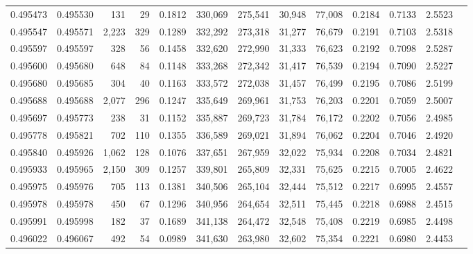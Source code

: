 \begin{tabular}{rrrrrrrrrrrrr}
0.495473 & 0.495530 &   131 &    29 &                                     0.1812 & 330,069 & 275,541 &  30,948 &  77,008 & 0.2184 & 0.7133 & 2.5523 \\
0.495547 & 0.495571 & 2,223 &   329 &                                     0.1289 & 332,292 & 273,318 &  31,277 &  76,679 & 0.2191 & 0.7103 & 2.5318 \\
0.495597 & 0.495597 &   328 &    56 &                                     0.1458 & 332,620 & 272,990 &  31,333 &  76,623 & 0.2192 & 0.7098 & 2.5287 \\
0.495600 & 0.495680 &   648 &    84 &                                     0.1148 & 333,268 & 272,342 &  31,417 &  76,539 & 0.2194 & 0.7090 & 2.5227 \\
0.495680 & 0.495685 &   304 &    40 &                                     0.1163 & 333,572 & 272,038 &  31,457 &  76,499 & 0.2195 & 0.7086 & 2.5199 \\
0.495688 & 0.495688 & 2,077 &   296 &                                     0.1247 & 335,649 & 269,961 &  31,753 &  76,203 & 0.2201 & 0.7059 & 2.5007 \\
0.495697 & 0.495773 &   238 &    31 &                                     0.1152 & 335,887 & 269,723 &  31,784 &  76,172 & 0.2202 & 0.7056 & 2.4985 \\
0.495778 & 0.495821 &   702 &   110 &                                     0.1355 & 336,589 & 269,021 &  31,894 &  76,062 & 0.2204 & 0.7046 & 2.4920 \\
0.495840 & 0.495926 & 1,062 &   128 &                                     0.1076 & 337,651 & 267,959 &  32,022 &  75,934 & 0.2208 & 0.7034 & 2.4821 \\
0.495933 & 0.495965 & 2,150 &   309 &                                     0.1257 & 339,801 & 265,809 &  32,331 &  75,625 & 0.2215 & 0.7005 & 2.4622 \\
0.495975 & 0.495976 &   705 &   113 &                                     0.1381 & 340,506 & 265,104 &  32,444 &  75,512 & 0.2217 & 0.6995 & 2.4557 \\
0.495978 & 0.495978 &   450 &    67 &                                     0.1296 & 340,956 & 264,654 &  32,511 &  75,445 & 0.2218 & 0.6988 & 2.4515 \\
0.495991 & 0.495998 &   182 &    37 &                                     0.1689 & 341,138 & 264,472 &  32,548 &  75,408 & 0.2219 & 0.6985 & 2.4498 \\
0.496022 & 0.496067 &   492 &    54 &                                     0.0989 & 341,630 & 263,980 &  32,602 &  75,354 & 0.2221 & 0.6980 & 2.4453 \\

\end{tabular}
